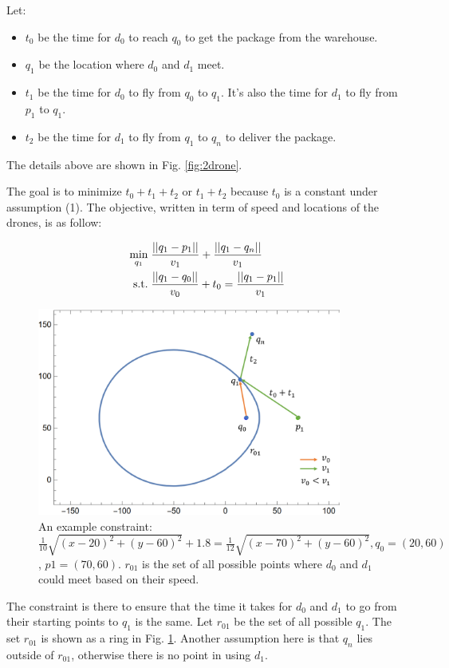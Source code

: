 \documentclass[]{article}
\begin{document}
Let:
\begin{itemize}
	\item $t_0$ be the time for $d_0$ to reach $q_0$ to get the package from the warehouse.
	\item $q_1$ be the location where $d_0$ and $d_1$ meet.
	\item $t_1$ be the time for $d_0$ to fly from $q_0$ to $q_1$. It's also the time for $d_1$ to fly from $p_1$ to $q_1$.
	\item $t_2$ be the time for $d_1$ to fly from $q_1$ to $q_n$ to deliver the package.
\end{itemize}

The details above are shown in Fig. \ref{fig:2drone}.

The goal is to minimize $t_0+t_1+t_2$ or $t_1+t_2$ because $t_0$ is a constant under assumption (1). The objective, written in term of speed and locations of the drones, is as follow:

\begin{align*}
\min_{q_1}\; &\frac{||q_1-p_1||}{v_1} + \frac{||q_1-q_n||}{v_1} \\
\textnormal{s.t.}\; &\frac{||q_1-q_0||}{v_0} + t_0 = \frac{||q_1-p_1||}{v_1}
\end{align*}

\begin{figure}[!h]
	\centering
	\includegraphics[width=10cm]{figures/2drones_q1qn.png}
	\caption{An example constraint: $\frac{1}{10}  \sqrt{{(x - 20)}^2 + {(y - 60)}^2} + 1.8 = \frac{1}{12} \sqrt{{(x - 70)}^2 + {(y - 60)}^2}, q_0=(20,60)$, $p1 = (70,60)$. $r_{01}$ is the set of all possible points where $d_0$ and $d_1$ could meet based on their speed.}
	\label{fig:2drone_q1}
\end{figure}

The constraint is there to ensure that the time it takes for $d_0$ and $d_1$ to go from their starting points to $q_1$ is the same. Let $r_{01}$ be the set of all possible $q_1$. The set $r_{01}$ is shown as a ring in Fig. \ref{fig:2drone_q1}. Another assumption here is that $q_n$ lies outside of $r_{01}$, otherwise there is no point in using $d_1$.
\end{document}
